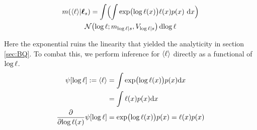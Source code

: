 \documentclass{article}
\begin{document}

%
%
%
\begin{multline}\label{eq:minty_l}
\mean{\inty{\lfn}}{\vr_s}
 =\int \Bigl( \int \exp\bigl(\tr(\lfv)\bigr)\lfn(\lfv)\po{\lfv}\,\ud\lfv\Bigr)\\
\N{\tr}{\meancondfn{\tr}{s}}{\covcondfn{\tr}{s}} \ud \tr
\end{multline}

Here the exponential ruins the linearity that yielded the analyticity in section \ref{sec:BQ}. To combat this, we perform inference for $\inty{\lfn}$ directly as a functional of $\tr$.
%
\begin{align*}
 \psi[\tr] \deq \inty{\lfn} & = \int \exp \bigl( \tr(\lfv)\bigr) p(\lfv) \ud \lfv\\
  						    & = \int \lfn(\lfv) p(\lfv) \ud \lfv\\
\pderiv{}{\tr(\lfv)}\psi[\tr] & = \exp \bigl( \tr(\lfv)\bigr) p(\lfv)  = \lfn(\lfv) p(\lfv) 
\end{align*}
\end{document}
